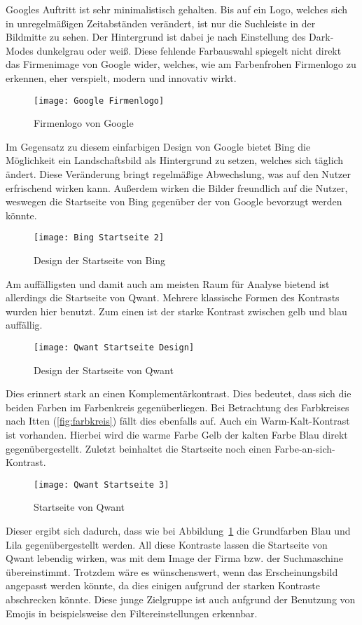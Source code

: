 Googles Auftritt ist sehr minimalistisch gehalten. Bis auf ein Logo, welches sich in unregelmäßigen Zeitabständen verändert,
ist nur die Suchleiste in der Bildmitte zu sehen. Der Hintergrund ist dabei je nach Einstellung des Dark-Modes dunkelgrau
oder weiß. Diese fehlende Farbauswahl spiegelt nicht direkt das Firmenimage von Google wider, welches, wie am Farbenfrohen
Firmenlogo zu erkennen, eher verspielt, modern und innovativ wirkt.
\begin{figure}[h]
    \centering
    \texttt{[image: Google Firmenlogo]}
    \caption{Firmenlogo von Google\autocite{.2020}}
\end{figure}

Im Gegensatz zu diesem einfarbigen Design von Google bietet Bing die Möglichkeit ein Landschaftsbild als Hintergrund zu
setzen, welches sich täglich ändert. Diese Veränderung bringt regelmäßige Abwechslung, was auf den Nutzer erfrischend wirken
kann. Außerdem wirken die Bilder freundlich auf die Nutzer, weswegen die Startseite von Bing gegenüber der von Google
bevorzugt werden könnte.
\begin{figure}[h]
    \centering
    \texttt{[image: Bing Startseite 2]}
    \caption{Design der Startseite von Bing}
\end{figure}

Am auffälligsten und damit auch am meisten Raum für Analyse bietend ist allerdings die Startseite von Qwant. Mehrere
klassische Formen des Kontrasts wurden hier benutzt. Zum einen ist der starke Kontrast zwischen gelb und blau auffällig.
\begin{figure}[h]
    \centering
    \texttt{[image: Qwant Startseite Design]}
    \caption{Design der Startseite von Qwant}
\end{figure}
Dies erinnert stark an einen Komplementärkontrast. Dies bedeutet, dass sich die beiden Farben im Farbenkreis gegenüberliegen\autocite[Seite 33]{Maulhardt.20220513}.
Bei Betrachtung des Farbkreises nach Itten (\ref{fig:farbkreis}) fällt dies ebenfalls auf.
Auch ein Warm-Kalt-Kontrast ist vorhanden. Hierbei wird die warme Farbe Gelb der kalten Farbe Blau direkt gegenübergestellt\autocite[Seite 34]{Maulhardt.20220513}.
Zuletzt beinhaltet die Startseite noch einen Farbe-an-sich-Kontrast.
\begin{figure}[h]
    \centering
    \texttt{[image: Qwant Startseite 3]}
    \caption{Startseite von Qwant}
    \label{fig:qwantstartseite3}
\end{figure}
Dieser ergibt sich dadurch,
dass wie bei Abbildung~\ref{fig:qwantstartseite3} die Grundfarben Blau und Lila gegenübergestellt werden\autocite[Seite 38]{Maulhardt.20220513}. All diese Kontraste
lassen die Startseite von Qwant lebendig wirken, was mit dem Image der Firma bzw. der Suchmaschine übereinstimmt.
Trotzdem wäre es wünschenswert, wenn das Erscheinungsbild angepasst werden könnte, da dies einigen aufgrund der starken
Kontraste abschrecken könnte. Diese junge Zielgruppe ist auch aufgrund der Benutzung von Emojis in beispielsweise den
Filtereinstellungen erkennbar.


